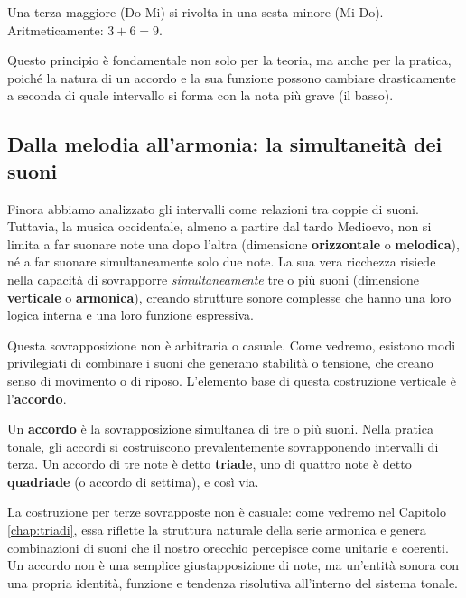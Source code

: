 \begin{esempio}
	\label{ex:inversione_intervallo}
	Una terza maggiore (Do-Mi) si rivolta in una sesta minore (Mi-Do). Aritmeticamente: $3+6=9$.
\end{esempio}

Questo principio è fondamentale non solo per la teoria, ma anche per la pratica, poiché la natura di un accordo e la sua funzione possono cambiare drasticamente a seconda di quale intervallo si forma con la nota più grave (il basso).

\subsection{Dalla melodia all'armonia: la simultaneità dei suoni}

Finora abbiamo analizzato gli intervalli come relazioni tra coppie di suoni. Tuttavia, la musica occidentale, almeno a partire dal tardo Medioevo, non si limita a far suonare note una dopo l'altra (dimensione \textbf{orizzontale} o \textbf{melodica}), né a far suonare simultaneamente solo due note. La sua vera ricchezza risiede nella capacità di sovrapporre \textit{simultaneamente} tre o più suoni (dimensione \textbf{verticale} o \textbf{armonica}), creando strutture sonore complesse che hanno una loro logica interna e una loro funzione espressiva.

Questa sovrapposizione non è arbitraria o casuale. Come vedremo, esistono modi privilegiati di combinare i suoni che generano stabilità o tensione, che creano senso di movimento o di riposo. L'elemento base di questa costruzione verticale è l'\textbf{accordo}.


\begin{definizione}[Accordo]
	\label{def:accordo}
	Un \textbf{accordo} è la sovrapposizione simultanea di tre o più suoni. Nella pratica tonale, gli accordi si costruiscono prevalentemente sovrapponendo intervalli di terza. Un accordo di tre note è detto \textbf{triade}, uno di quattro note è detto \textbf{quadriade} (o accordo di settima), e così via.
\end{definizione}

La costruzione per terze sovrapposte non è casuale: come vedremo nel Capitolo \ref{chap:triadi}, essa riflette la struttura naturale della serie armonica e genera combinazioni di suoni che il nostro orecchio percepisce come unitarie e coerenti. Un accordo non è una semplice giustapposizione di note, ma un'entità sonora con una propria identità, funzione e tendenza risolutiva all'interno del sistema tonale.


